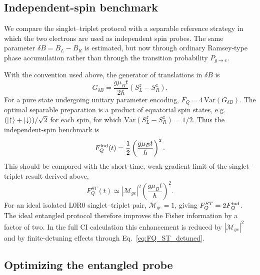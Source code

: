 \documentclass[fleqn,10pt]{wlscirep}
\newcommand\MEP[1]{\textcolor{pink}{MEP: \textsl{#1}}}
\begin{document}
\subsection{Independent-spin benchmark}

We compare the singlet--triplet protocol with a separable reference strategy in
which the two electrons are used as independent spin probes.  The same parameter
$\delta B=B_L-B_R$ is estimated, but now through ordinary Ramsey-type phase
accumulation rather than through the transition probability $P_{g\to e}$.

With the convention used above, the generator of translations in $\delta B$ is
\begin{equation}
  G_{\delta B}
  =
  \frac{g\mu_B t}{2\hbar}
  \left(S^z_L-S^z_R\right).
\end{equation}
For a pure state undergoing unitary parameter encoding, $F_Q=4\,\mathrm{Var}(G_{\delta B})$.
The optimal separable preparation is a product of equatorial spin states, e.g.
$(\ket{\uparrow}+\ket{\downarrow})/\sqrt{2}$ for each spin,  for which $ \mathrm{Var}\left(S^z_L-S^z_R\right)=1/2$.
Thus the independent-spin benchmark is
\begin{equation}
  F_Q^{\rm ind}(t)
  =
  \frac{1}{2}
  \left(
  \frac{g\mu_B t}{\hbar}
  \right)^2 .
  \label{eq:FQ_independent}
\end{equation}
This should be compared with the short-time, weak-gradient limit of the
singlet--triplet result derived above,
\begin{equation}
  F_Q^{ST}(t)
  \simeq
  |\mathcal M_{ge}|^2
  \left(
  \frac{g\mu_B t}{\hbar}
  \right)^2 .
  \label{eq:FQ_ST_compare}
\end{equation}
For an ideal isolated $\mathrm{L0}\mathrm{R0}$ singlet--triplet pair,
$\mathcal M_{ge}=1$, giving
$ F_Q^{ST}=2F_Q^{\rm ind}$.
The ideal entangled protocol therefore improves the Fisher information by a factor
of two.  In the full CI calculation this enhancement is reduced by
$|\mathcal M_{ge}|^2$ and by finite-detuning effects through
Eq.~\eqref{eq:FQ_ST_detuned}.

\subsection{Optimizing the entangled probe}
\label{sec:rl}


\end{document}
